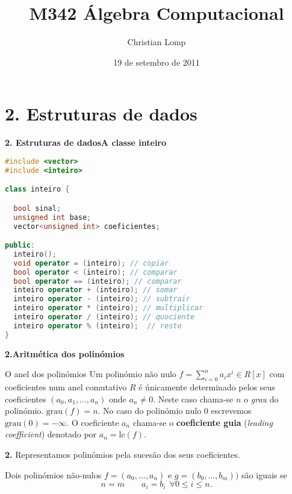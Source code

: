 \documentclass[handout]{beamer}
\title[M342]{M342 Álgebra Computacional}
\author{Christian Lomp}
\institute{FCUP}
\date{19 de setembro de 2011}
\newcommand{\grau}[1]{\mathrm{grau}({#1})}
\newcommand{\lc}[1]{\mathrm{lc}(#1)}
\begin{document}
\begin{frame}
\titlepage
\end{frame}





\section{2. Estruturas de dados}

\begin{frame}[fragile]{\bf 2. Estruturas de dados}{\bf A classe inteiro}

\lstset{language=C++,basicstyle=\tiny}
\begin{lstlisting}[language=C++]
#include <vector>
#include <inteiro>

class inteiro {

  bool sinal;
  unsigned int base;
  vector<unsigned int> coeficientes;

public:
  inteiro();
  void operator = (inteiro); // copiar 
  bool operator < (inteiro); // comparar
  bool operator == (inteiro); // comparar
  inteiro operator + (inteiro); // somar
  inteiro operator - (inteiro); // subtrair
  inteiro operator * (inteiro); // multiplicar
  inteiro operator / (inteiro); // quociente
  inteiro operator % (inteiro);  // resto
}

\end{lstlisting}
\end{frame}


\begin{frame}{\bf 2.}{\bf Aritmética dos polinómios}
\begin{block}{O anel dos polinómios}
Um polinómio não nulo $f=\sum_{i=0}^n a_i x^i \in R[x]$ com coeficientes num anel comutativo $R$ é únicamente determinado pelos seus coeficientes $(a_0,a_1,\ldots, a_n)$ onde $a_n\neq 0$. \pause Neste caso chama-se $n$ o {\it grau} do polinómio. $\grau{f}=n$. No caso do polinómio nulo $0$ escrevemos $\grau{0}=-\infty$.
\pause
O coeficiente $a_n$ chama-se o {\bf coeficiente guia} ({\it leading coefficient}) denotado por $a_n=\lc{f}$.
\end{block}
\end{frame}

\begin{frame}{\bf 2.}
Representamos polinómios pela sucesão dos seus coeficientes.

\pause 
Dois polinómios não-nulos $f=(a_0,\ldots, a_n)$ e $g=(b_0,\ldots, b_m))$ são iguais se
$$n=m \qquad a_i=b_i \:\:\forall 0\leq i\leq n.$$

\end{frame}
\end{document}
